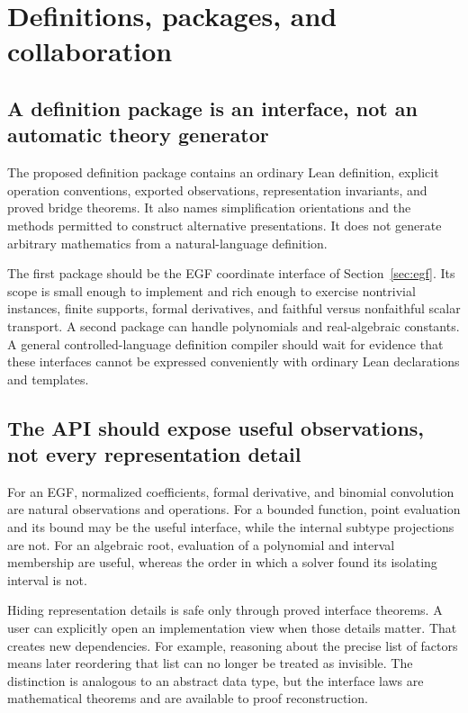 \documentclass[11pt,a4paper]{article}
\theoremstyle{definition}
\begin{document}
\section{Definitions, packages, and collaboration}\label{sec:definitions}
\subsection{A definition package is an interface, not an automatic theory generator}
The proposed definition package contains an ordinary Lean definition, explicit
operation conventions, exported observations, representation invariants, and
proved bridge theorems. It also names simplification orientations and the methods
permitted to construct alternative presentations. It does not generate arbitrary
mathematics from a natural-language definition.

The first package should be the EGF coordinate interface of
Section~\ref{sec:egf}. Its scope is small enough to implement and rich enough to
exercise nontrivial instances, finite supports, formal derivatives, and faithful
versus nonfaithful scalar transport. A second package can handle polynomials and
real-algebraic constants. A general controlled-language definition compiler
should wait for evidence that these interfaces cannot be expressed conveniently
with ordinary Lean declarations and templates.

\subsection{The API should expose useful observations, not every representation detail}
For an EGF, normalized coefficients, formal derivative, and binomial convolution
are natural observations and operations. For a bounded function, point evaluation
and its bound may be the useful interface, while the internal subtype projections
are not. For an algebraic root, evaluation of a polynomial and interval membership
are useful, whereas the order in which a solver found its isolating interval is
not.

Hiding representation details is safe only through proved interface theorems.
A user can explicitly open an implementation view when those details matter.
That creates new dependencies. For example, reasoning about the precise list of
factors means later reordering that list can no longer be treated as invisible.
The distinction is analogous to an abstract data type, but the interface laws are
mathematical theorems and are available to proof reconstruction.
\end{document}

